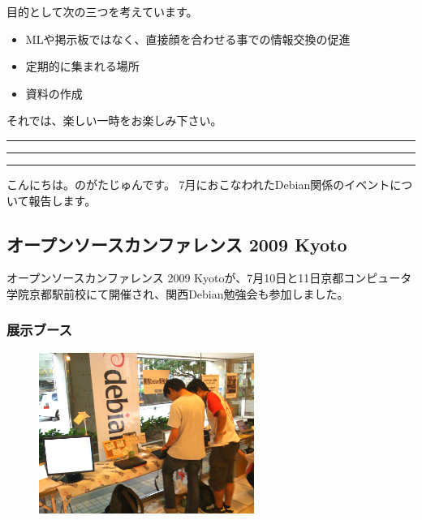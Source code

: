 \documentclass[mingoth,a4paper]{jsarticle}
\begin{document}
 目的として次の三つを考えています。
 \begin{itemize}
  \item MLや掲示板ではなく、直接顔を合わせる事での情報交換の促進
  \item 定期的に集まれる場所
  \item 資料の作成
 \end{itemize}

 それでは、楽しい一時をお楽しみ下さい。

\newpage

\begin{minipage}[b]{0.2\hsize}
 {}
\end{minipage}
\begin{minipage}[b]{0.8\hsize}
\hrule
\vspace{2mm}
\hrule
\setcounter{tocdepth}{1}
\tableofcontents
\vspace{2mm}
\hrule
\end{minipage}


こんにちは。のがたじゅんです。
7月におこなわれたDebian関係のイベントについて報告します。

\subsection{オープンソースカンファレンス 2009 Kyoto}

オープンソースカンファレンス 2009 Kyotoが、7月10日と11日京都コンピュータ
学院京都駅前校にて開催され、関西Debian勉強会も参加しました。

\subsubsection{展示ブース}

 \begin{figure}
  \includegraphics[width=7cm]{image200908/kansai-event-osc2009.jpg}
 \end{figure}
\end{document}
